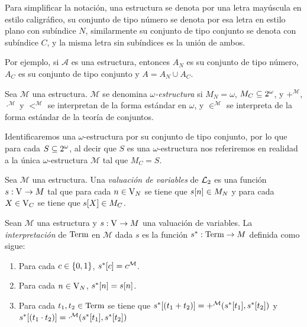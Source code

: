 \begin{notation}
	Para simplificar la notación, una estructura se denota por una letra mayúscula en estilo caligráfico, su conjunto de tipo número se denota por esa letra en estilo plano con subíndice $N$, similarmente su conjunto de tipo conjunto se denota con subíndice $C$, y la misma letra sin subíndices es la unión de ambos.

	Por ejemplo, si $\mathcal{A}$ es una estructura, entonces $A_{N}$ es su conjunto de tipo número, $A_{C}$ es su conjunto de tipo conjunto y $A = A_{N}\cup A_{C}$.
\end{notation}

\begin{definition}
	Sea $\mathcal{M}$ una estructura. $\mathcal{M}$ se denomina \emph{$\omega$-estructura} si $M_{N} =\omega$, $M_{C}\subseteq\CPOTENCIA{\omega}$, y $+^{\mathcal{M}}$, $\cdot^{\mathcal{M}}$ y $<^{\mathcal{M}}$ se interpretan de la forma estándar en $\omega$, y $\in^{\mathcal{M}}$ se interpreta de la forma estándar de la teoría de conjuntos.

	Identificaremos una $\omega$-estructura por su conjunto de tipo conjunto, por lo que para cada $S\subseteq\CPOTENCIA{\omega}$, al decir que $S$ es una $\omega$-estructura nos referiremos en realidad a la única $\omega$-estructura $\mathcal{M}$ tal que $M_{C} = S$.
\end{definition}


\begin{definition}
	Sea $\mathcal{M}$ una estructura. Una \emph{valuación de variables} de $\ARITMETICA$ es una función $s:\VARIABLES\to M$ tal que para cada $n\in\VARIABLES[N]$ se tiene que $s\bra*{n}\in M_{N}$ y para cada $X\in\VARIABLES[C]$ se tiene que $s\bra*{X}\in M_{C}$.
\end{definition}

\begin{definition}
	Sean $\mathcal{M}$ una estructura y $s:\VARIABLES\to M$ una valuación de variables. La \emph{interpretación} de $\TERMINOS$ en $\mathcal{M}$ dada $s$ es la función $s^{*}:\TERMINOS\to M$ definida como sigue:

	\begin{enumerate}
		\item Para cada $c\in\set*{0, 1}$, $s^{*}\bra*{c} = c^{\mathcal{M}}$.
		\item Para cada $n\in\VARIABLES[N]$, $s^{*}\bra*{n} = s\bra*{n}$.
		\item Para cada $t_{1}, t_{2}\in\TERMINOS$ se tiene que $s^{*}\bra*{\pa*{t_{1} + t_{2}}} = +^{\mathcal{M}}\pa*{s^{*}\bra*{t_{1}}, s^{*}\bra*{t_{2}}}$ y $s^{*}\bra*{\pa*{t_{1}\cdot t_{2}}} =\cdot^{\mathcal{M}}\pa*{s^{*}\bra*{t_{1}}, s^{*}\bra*{t_{2}}}$
	\end{enumerate}
\end{definition}

